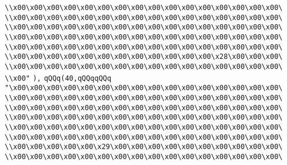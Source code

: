 \verb|\\x00\x00\x00\x00\x00\x00\x00\x00\x00\x00\x00\x00\x00\x00\x00\x00\|\newline
\verb|\\x00\x00\x00\x00\x00\x00\x00\x00\x00\x00\x00\x00\x00\x00\x00\x00\|\newline
\verb|\\x00\x00\x00\x00\x00\x00\x00\x00\x00\x00\x00\x00\x00\x00\x00\x00\|\newline
\verb|\\x00\x00\x00\x00\x00\x00\x00\x00\x00\x00\x00\x00\x00\x00\x00\x00\|\newline
\verb|\\x00\x00\x00\x00\x00\x00\x00\x00\x00\x00\x00\x00\x00\x00\x00\x00\|\newline
\verb|\\x00\x00\x00\x00\x00\x00\x00\x00\x00\x00\x00\x00\x28\x00\x00\x00\|\newline
\verb|\\x00\x00\x00\x00\x00\x00\x00\x00\x00\x00\x00\x00\x00\x00\x00\x00\|\newline
\verb|\\x00"|\newline
\verb|),|\newline
\verb|qQQq(40,qQQqqQQq|\newline
\verb|"\x00\x00\x00\x00\x00\x00\x00\x00\x00\x00\x00\x00\x00\x00\x00\x00\|\newline
\verb|\\x00\x00\x00\x00\x00\x00\x00\x00\x00\x00\x00\x00\x00\x00\x00\x00\|\newline
\verb|\\x00\x00\x00\x00\x00\x00\x00\x00\x00\x00\x00\x00\x00\x00\x00\x00\|\newline
\verb|\\x00\x00\x00\x00\x00\x00\x00\x00\x00\x00\x00\x00\x00\x00\x00\x00\|\newline
\verb|\\x00\x00\x00\x00\x00\x00\x00\x00\x00\x00\x00\x00\x00\x00\x00\x00\|\newline
\verb|\\x00\x00\x00\x00\x00\x00\x00\x00\x00\x00\x00\x00\x00\x00\x00\x00\|\newline
\verb|\\x00\x00\x00\x00\x00\x29\x00\x00\x00\x00\x00\x00\x00\x00\x00\x00\|\newline
\verb|\\x00\x00\x00\x00\x00\x00\x00\x00\x00\x00\x00\x00\x00\x00\x00\x00\|\newline
